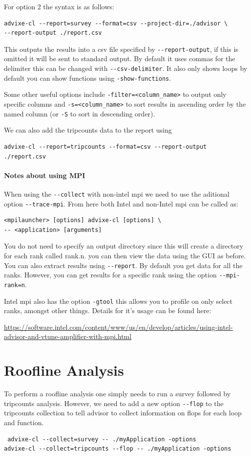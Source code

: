 \documentclass[a4paper, 11pt]{article}
\begin{document}
 For option 2 the syntax is as follows:
 \begin{verbatim}
advixe-cl --report=survey --format=csv --project-dir=./advisor \
--report-output ./report.csv
\end{verbatim}

This outputs the results into a csv file specified by \verb+--report-output+, if this is omitted it will be sent to standard output. By default it uses commas for the delimiter this can be changed with \verb+--csv-delimiter+. It also only shows loops by default you can show functions using \verb+-show-functions+.

Some other useful options include \verb+-filter=<column_name>+ to output only specific columns and \verb+-s=<column_name>+ to sort results in ascending order by the named column (or \verb+-S+ to sort in descending order).

We can also add the tripcounts data to the report using 
 \begin{verbatim}
advixe-cl --report=tripcounts --format=csv --report-output ./report.csv
\end{verbatim}

\paragraph{Notes about using MPI} When using the \verb+--collect+ with non-intel mpi we need to use the aditional option \verb+--trace-mpi+. From here both Intel and non-Intel mpi can be called as:
 \begin{verbatim}
<mpilauncher> [options] advixe-cl [options] \
-- <application> [arguments] 
\end{verbatim}

You do not need to specify an output directory since this will create a directory for each rank called rank.n. you can then view the data using the GUI as before. You can also extract results using \verb+--report+. By default you get data for all the ranks. However, you can get results for a specific rank using the option \verb+--mpi-rank=n+. 

Intel mpi also has the option \verb+-gtool+ this allows you to profile on only select ranks, amongst other things. Details for it's usage can be found here: 

\url{https://software.intel.com/content/www/us/en/develop/articles/using-intel-advisor-and-vtune-amplifier-with-mpi.html}

\section{Roofline Analysis}
To perform a roofline analysis one simply needs to run a survey followed by tripcounts analysis. However, we need to add a new option \verb+--flop+ to the tripcounts collection to tell advisor to collect information on flops for each loop and function.
 \begin{verbatim}
 advixe-cl --collect=survey -- ./myApplication -options
advixe-cl --collect=tripcounts --flop -- ./myApplication -options
\end{verbatim}
\end{document}
